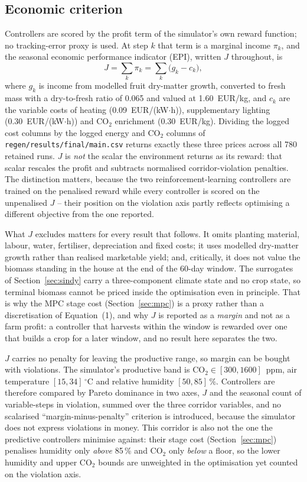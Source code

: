 \subsection{Economic criterion}
\label{sec:epi}

Controllers are scored by the profit term of the simulator's own reward function; no
tracking-error proxy is used. At step $k$ that term is a marginal income $\pi_k$, and the
seasonal economic performance indicator (EPI), written $J$ throughout, is
%
\begin{equation}
J=\sum_{k}\pi_k=\sum_{k}\bigl(g_k-c_k\bigr),
\end{equation}
%
where $g_k$ is income from modelled fruit dry-matter growth, converted to fresh mass
with a dry-to-fresh ratio of 0.065 and valued at 1.60~EUR/kg, and $c_k$ are the
variable costs of heating (0.09~EUR/(kW$\cdot$h)), supplementary lighting
(0.30~EUR/(kW$\cdot$h)) and CO$_2$ enrichment (0.30~EUR/kg). Dividing the logged cost
columns by the logged energy and CO$_2$ columns of
\texttt{regen/results/final/main.csv} returns exactly these three prices across all 780
retained runs. $J$ is \emph{not} the scalar the environment returns as its reward: that
scalar rescales the profit and subtracts normalised corridor-violation penalties. The
distinction matters, because the two reinforcement-learning controllers are trained on the
penalised reward while every controller is scored on the unpenalised $J$ -- their position
on the violation axis partly reflects optimising a different objective from the one
reported.

What $J$ excludes matters for every result that follows. It omits planting material,
labour, water, fertiliser, depreciation and fixed costs; it uses modelled dry-matter
growth rather than realised marketable yield; and, critically, it does not value the
biomass standing in the house at the end of the 60-day window. The surrogates of
Section~\ref{sec:sindy} carry a three-component climate state and no crop state, so
terminal biomass cannot be priced inside the optimisation even in principle. That is why
the MPC stage cost (Section~\ref{sec:mpc}) is a proxy rather than a discretisation of
Equation~(1), and why $J$ is reported as a \emph{margin} and not as a farm
profit: a controller that harvests within the window is rewarded over one that builds a
crop for a later window, and no result here separates the two.

$J$ carries no penalty for leaving the productive range, so margin can be bought with
violations. The simulator's productive band is CO$_2\in[300,1600]$~ppm, air temperature
$[15,34]\,^\circ$C and relative humidity $[50,85]\,\%$. Controllers are therefore
compared by Pareto dominance in two axes, $J$ and the seasonal count of variable-steps in violation, summed over the three corridor variables, and no scalarised ``margin-minus-penalty'' criterion is introduced,
because the simulator does not express violations in money. This corridor is also not the
one the predictive controllers minimise against: their stage cost (Section~\ref{sec:mpc})
penalises humidity only \emph{above} 85\,\% and CO$_2$ only \emph{below} a floor, so the
lower humidity and upper CO$_2$ bounds are unweighted in the optimisation yet counted on
the violation axis.

